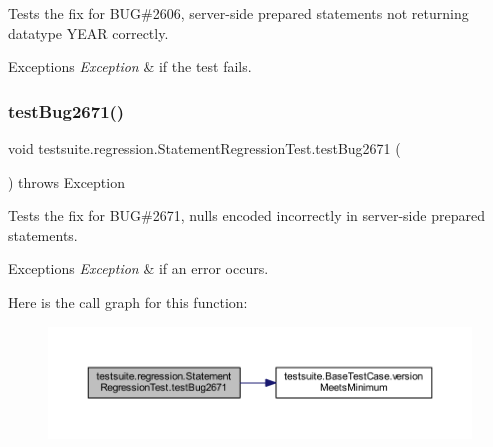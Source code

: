 Tests the fix for B\+UG\#2606, server-\/side prepared statements not returning datatype Y\+E\+AR correctly.


\begin{DoxyExceptions}{Exceptions}
{\em Exception} & if the test fails. \\
\hline
\end{DoxyExceptions}
\mbox{\label{classtestsuite_1_1regression_1_1_statement_regression_test_a85e39314f65a8b5de7bf5da11ed1fcad}} 
\subsubsection{\texorpdfstring{test\+Bug2671()}{testBug2671()}}
{\footnotesize\ttfamily void testsuite.\+regression.\+Statement\+Regression\+Test.\+test\+Bug2671 (\begin{DoxyParamCaption}{ }\end{DoxyParamCaption}) throws Exception}

Tests the fix for B\+UG\#2671, nulls encoded incorrectly in server-\/side prepared statements.


\begin{DoxyExceptions}{Exceptions}
{\em Exception} & if an error occurs. \\
\hline
\end{DoxyExceptions}
Here is the call graph for this function\+:
\nopagebreak
\begin{figure}[H]
\begin{center}
\leavevmode
\includegraphics[width=350pt]{classtestsuite_1_1regression_1_1_statement_regression_test_a85e39314f65a8b5de7bf5da11ed1fcad_cgraph}
\end{center}
\end{figure}
\mbox{\label{classtestsuite_1_1regression_1_1_statement_regression_test_a8fe44dff0f28bc878c51eb27e789c9b4}} 

